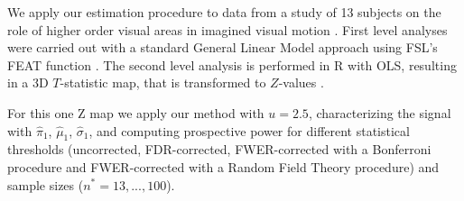 We apply our estimation procedure to data from a study of 13 subjects on the role of higher order visual areas in imagined visual motion \citep{Seurinck2011}.  First level analyses were carried out with a standard General Linear Model approach using FSL's FEAT function \citep{Jenkinson2012}.  The second level analysis is performed in R with OLS, resulting in a 3D $T$-statistic map, that is transformed to $Z$-values \citep{Hughett2007}.

For this one Z map we apply our method with $u=2.5$, characterizing the signal with $\hat\pi_1$, $\hat\mu_1$, $\hat\sigma_1$, and computing prospective power for different statistical thresholds (uncorrected, FDR-corrected, FWER-corrected with a Bonferroni procedure and FWER-corrected with a Random Field Theory procedure) and sample sizes ($n^*=13,...,100$).
